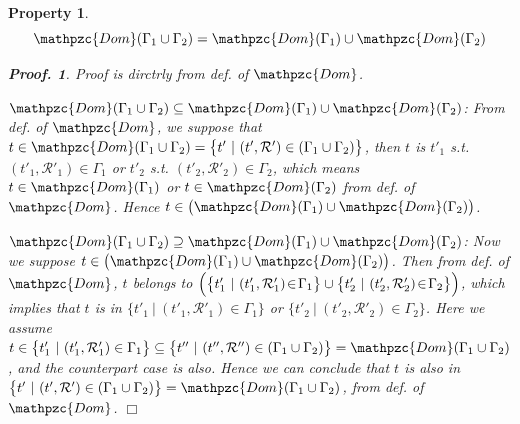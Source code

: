 \documentclass[12pt]{article}
\newtheorem{Property}{Property}[section]
\newtheorem{Proof}{Proof.}
\begin{document}
\begin{Property} \label{dom_bin_join}
  \[ \mathpzc{Dom}(\Gamma_1 \cup \Gamma_2) =
      \mathpzc{Dom}(\Gamma_1) \cup \mathpzc{Dom}(\Gamma_2)
  \]
  \begin{Proof}
    Proof is dirctrly from def. of $\mathpzc{Dom}$.
    
    $\mathpzc{Dom}(\Gamma_1 \cup \Gamma_2) \subseteq
    \mathpzc{Dom}(\Gamma_1) \cup \mathpzc{Dom}(\Gamma_2)$:
    From def. of $\mathpzc{Dom}$, we suppose that
    $t \in \mathpzc{Dom}(\Gamma_1 \cup \Gamma_2) =
    \bigl\{t' \ |\ (t', \mathcal{R}') \in (\Gamma_1 \cup \Gamma_2)
    \bigr\}$, then $t$ is $t'_1$ s.t. $(t'_1, \mathcal{R}'_1) \in \Gamma_1$
    or $t'_2$ s.t. $(t'_2, \mathcal{R}'_2) \in \Gamma_2$, which means
    $t \in \mathpzc{Dom}(\Gamma_1)$ or $t \in \mathpzc{Dom}(\Gamma_2)$ from
    def. of $\mathpzc{Dom}$. Hence
    $t \in \bigl(\mathpzc{Dom}(\Gamma_1) \cup \mathpzc{Dom}(\Gamma_2) \bigr)$.
    
    $\mathpzc{Dom}(\Gamma_1 \cup \Gamma_2) \supseteq
    \mathpzc{Dom}(\Gamma_1) \cup \mathpzc{Dom}(\Gamma_2)$:
    Now we suppose $t \in \bigl(\mathpzc{Dom}(\Gamma_1) \cup
    \mathpzc{Dom}(\Gamma_2) \bigr)$. Then from def. of $\mathpzc{Dom}$,
    $t$ belongs to $\Bigl(\bigl\{ t'_1 \ |\ (t'_1, \mathcal{R}'_1) \!\in\!
    \Gamma_1 \bigr\} \cup \bigl\{ t'_2 \ |\ (t'_2, \mathcal{R}'_2) \!\in\!
    \Gamma_2 \bigr\} \Bigr)$, which implies that
    $t$ is in $\bigl\{ t'_1 \ |\ (t'_1, \mathcal{R}'_1) \in \Gamma_1 \bigr\}$
    or $\bigl\{ t'_2 \ |\ (t'_2, \mathcal{R}'_2) \in \Gamma_2 \bigr\}$.
    Here we assume $t \in \bigl\{ t'_1 \ |\ (t'_1, \mathcal{R}'_1) \in
    \Gamma_1 \bigr\} \subseteq \bigl\{ t'' \ |\ (t'', \mathcal{R}'') \in
    (\Gamma_1 \cup \Gamma_2) \bigr\} = \mathpzc{Dom}(\Gamma_1 \cup
    \Gamma_2)$, and the counterpart case is also. Hence
    we can conclude that $t$ is also in
    $\bigl\{ t' \ |\ (t', \mathcal{R}') \in (\Gamma_1 \cup \Gamma_2)
    \bigr\} = \mathpzc{Dom}(\Gamma_1 \cup \Gamma_2)$, from def. of
    $\mathpzc{Dom}$.
    $\Box$
  \end{Proof}
\end{Property}
\end{document}
